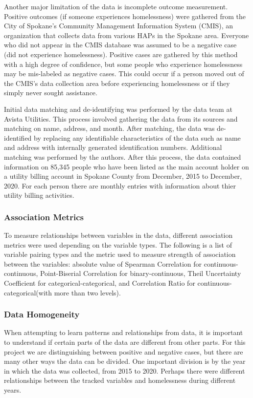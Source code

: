 \documentclass[10pt,letterpaper]{article}
\begin{document}
Another major limitation of the data is incomplete outcome measurement. Positive outcomes (if someone experiences homelessness) were gathered from the City of Spokane's Community Management Information System (CMIS), an organization that collects data from various HAPs in the Spokane area. Everyone who did not appear in the CMIS database was assumed to be a negative case (did not experience homelessness). Positive cases are gathered by this method with a high degree of confidence, but some people who experience homelessness may be mis-labeled as negative cases. This could occur if a person moved out of the CMIS's data collection area before experiencing homelessness or if they simply never sought assistance.

Initial data matching and de-identifying was performed by the data team at Avista Utilities. This process involved gathering the data from its sources and matching on name, address, and month. After matching, the data was de-identified by replacing any identifiable characteristics of the data such as name and address with internally generated identification numbers. Additional matching was performed by the authors. After this process, the data contained information on 85,345 people who have been listed as the main account holder on a utility billing account in Spokane County from December, 2015 to December, 2020. For each person there are monthly entries with information about thier utility billing activities. 

\subsubsection{Association Metrics}
To measure relationships between variables in the data, different association metrics were used depending on the variable types. The following is a list of variable pairing types and the metric used to measure strength of association between the variables: absolute value of Spearman Correlation for continuous-continuous, Point-Biserial Correlation for binary-continuous, Theil Uncertainty Coefficient for categorical-categorical, and Correlation Ratio for continuous-categorical(with more than two levels).

\subsubsection{Data Homogeneity}
When attempting to learn patterns and relationships from data, it is important to understand if certain parts of the data are different from other parts. For this project we are distinguishing between positive and negative cases, but there are many other ways the data can be divided. One important division is by the year in which the data was collected, from 2015 to 2020. Perhaps there were different relationships between the tracked variables and homelessness during different years. 
\end{document}
